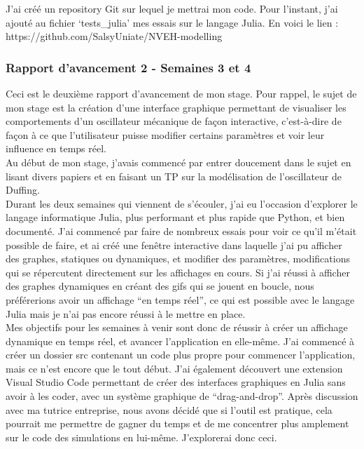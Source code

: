 \documentclass[a4paper, french, 12pt, titlepage]{article}
\begin{document}
	J’ai créé un repository Git sur lequel je mettrai mon code. Pour l’instant, j’ai ajouté au fichier ‘tests\_julia’ mes essais sur le langage Julia. En voici le lien : https://github.com/SalsyUniate/NVEH-modelling 


\subsubsection*{Rapport d'avancement 2 - Semaines 3 et 4}

Ceci est le deuxième rapport d’avancement de mon stage. Pour rappel, le sujet de mon stage est la création d’une interface graphique permettant de visualiser les comportements d’un oscillateur mécanique de façon interactive, c’est-à-dire de façon à ce que l’utilisateur puisse modifier certains paramètres et voir leur influence en temps réel. \\

Au début de mon stage, j’avais commencé par entrer doucement dans le sujet en lisant divers papiers et en faisant un TP sur la modélisation de l’oscillateur de Duffing. \\

Durant les deux semaines qui viennent de s’écouler, j’ai eu l’occasion d’explorer le langage informatique Julia, plus performant et plus rapide que Python, et bien documenté. J’ai commencé par faire de nombreux essais pour voir ce qu’il m’était possible de faire, et ai créé une fenêtre interactive dans laquelle j’ai pu afficher des graphes, statiques ou dynamiques, et modifier des paramètres, modifications qui se répercutent directement sur les affichages en cours. Si j’ai réussi à afficher des graphes dynamiques en créant des gifs qui se jouent en boucle, nous préférerions avoir un affichage “en temps réel”, ce qui est possible avec le langage Julia mais je n’ai pas encore réussi à le mettre en place. \\

Mes objectifs pour les semaines à venir sont donc de réussir à créer un affichage dynamique en temps réel, et avancer l’application en elle-même. J’ai commencé à créer un dossier src contenant un code plus propre pour commencer l’application, mais ce n’est encore que le tout début. J’ai également découvert une extension Visual Studio Code permettant de créer des interfaces graphiques en Julia sans avoir à les coder, avec un système graphique de “drag-and-drop”. Après discussion avec ma tutrice entreprise, nous avons décidé que si l’outil est pratique, cela pourrait me permettre de gagner du temps et de me concentrer plus amplement sur le code des simulations en lui-même. J’explorerai donc ceci. \\
\end{document}
